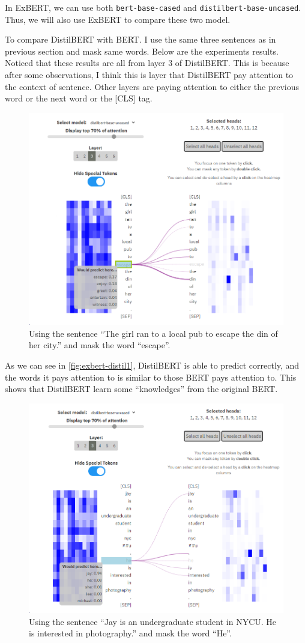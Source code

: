 \documentclass{article}[12pt]
\begin{document}
In ExBERT, we can use both \texttt{bert-base-cased} and \texttt{distilbert-base-uncased}. Thus, we will also use ExBERT to compare these two model.

To compare DistilBERT with BERT. I use the same three sentences as in previous section and mask same words. Below are the experiments results. Noticed that these results are all from layer 3 of DistilBERT. This is because after some observations, I think this is layer that DistilBERT pay attention to the context of sentence. Other layers are paying attention to either the previous word or the next word or the [CLS] tag.

\begin{figure}[htbp]
	\centering
	\includegraphics[width=0.7\linewidth]{figure/exbert-distil1}
	\caption{Using the sentence ``The girl ran to a local pub to escape the din of her city.'' and mask the word ``escape''.}
	\label{fig:exbert-distil1}
\end{figure}

As we can see in \autoref{fig:exbert-distil1}, DistilBERT is able to predict correctly, and the words it pays attention to is similar to those BERT pays attention to. This shows that DistilBERT learn some ``knowledges'' from the original BERT.

\begin{figure}[htbp]
	\centering
	\includegraphics[width=0.7\linewidth]{figure/exbert-distil2}
	\caption{Using the sentence ``Jay is an undergraduate student in NYCU. He is interested in photography.'' and mask the word ``He''.}
	\label{fig:exbert-distil2}
\end{figure}
\end{document}
